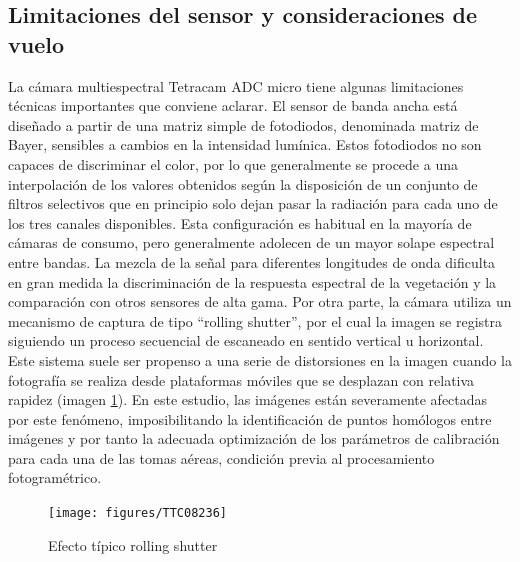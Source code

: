 \documentclass[spanish,openany]{article}
\begin{document}
\subsection{Limitaciones del sensor y consideraciones de
vuelo}\label{limitaciones-del-sensor-y-consideraciones-de-vuelo}

La cámara multiespectral Tetracam ADC micro tiene algunas limitaciones
técnicas importantes que conviene aclarar. El sensor de banda ancha está
diseñado a partir de una matriz simple de fotodiodos, denominada matriz
de Bayer, sensibles a cambios en la intensidad lumínica. Estos
fotodiodos no son capaces de discriminar el color, por lo que
generalmente se procede a una interpolación de los valores obtenidos
según la disposición de un conjunto de filtros selectivos que en
principio solo dejan pasar la radiación para cada uno de los tres
canales disponibles. Esta configuración es habitual en la mayoría de
cámaras de consumo, pero generalmente adolecen de un mayor solape
espectral entre bandas. La mezcla de la señal para diferentes longitudes
de onda dificulta en gran medida la discriminación de la respuesta
espectral de la vegetación y la comparación con otros sensores de alta
gama. Por otra parte, la cámara utiliza un mecanismo de captura de tipo
``rolling shutter'', por el cual la imagen se registra siguiendo un
proceso secuencial de escaneado en sentido vertical u horizontal. Este
sistema suele ser propenso a una serie de distorsiones en la imagen
cuando la fotografía se realiza desde plataformas móviles que se
desplazan con relativa rapidez (imagen \ref{fig:rolling}). En este
estudio, las imágenes están severamente afectadas por este fenómeno,
imposibilitando la identificación de puntos homólogos entre imágenes y
por tanto la adecuada optimización de los parámetros de calibración para
cada una de las tomas aéreas, condición previa al procesamiento
fotogramétrico.

\begin{figure}
\texttt{[image: figures/TTC08236]} \caption{Efecto típico rolling shutter}\label{fig:rolling}
\end{figure}
\end{document}

